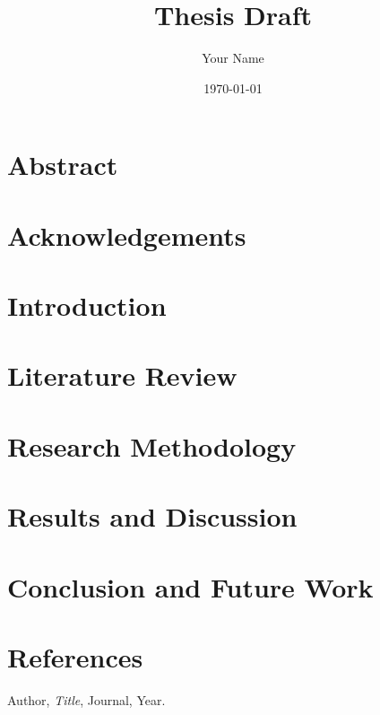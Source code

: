 \documentclass[12pt,a4paper]{report}
\title{Thesis Draft}
\author{Your Name}
\date{\today}
\begin{document}
\maketitle
{}

\chapter*{Abstract}
\lipsum[1] %

\chapter*{Acknowledgements}
\lipsum[2] %

\tableofcontents
\newpage


\chapter{Introduction}
\lipsum[3] %

\chapter{Literature Review}
\lipsum[4] %

\chapter{Research Methodology}
\lipsum[5] %

\chapter{Results and Discussion}


\chapter{Conclusion and Future Work}
\lipsum[6] %

\chapter*{References}

% 
\begin{thebibliography}{9}
 Author, \emph{Title}, Journal, Year.
\end{thebibliography}
\end{document}
